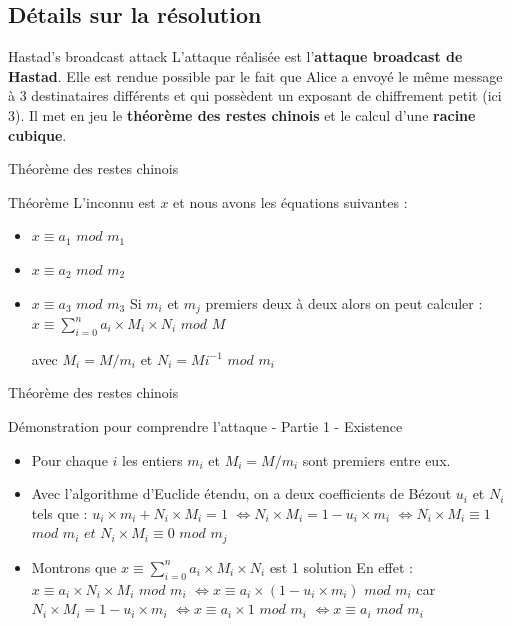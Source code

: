 \documentclass{beamer}
\begin{document}
	\subsection{Détails sur la résolution}

	\begin{frame}{Hastad's broadcast attack}
		L'attaque réalisée est l'\textbf{attaque broadcast de Hastad}. Elle est rendue possible par le fait que Alice a envoyé le même message à 3 destinataires différents et qui possèdent un exposant de chiffrement petit (ici $3$). Il met en jeu le \textbf{théorème des restes chinois} et le calcul d'une \textbf{racine cubique}.
	\end{frame}

	\begin{frame}{Théorème des restes chinois}
		\begin{block}{Théorème}
				L'inconnu est $x$ et nous avons les équations suivantes :
				\begin{itemize}
				\item $x \equiv a_1$ $mod$ $m_1$
				\item $x \equiv a_2$ $mod$ $m_2$
				\item $x \equiv a_3$ $mod$ $m_3$
				Si $m_i$ et $m_j$ premiers deux à deux alors on peut calculer : \newline
				\color{red}$x \equiv \sum \limits_{i=0}^{n}a_i \times M_i \times N_i$ $mod$ $M$ \color{black}

				avec $M_i=M / m_{i}$ et $N_i = Mi^{-1}$ $mod$ $m_i$
			\end{itemize}
		\end{block}
	\end{frame}

	\begin{frame}{Théorème des restes chinois}
	\begin{alertblock}{Démonstration pour comprendre l'attaque - Partie 1 - Existence}
		\begin{itemize}
		\item Pour chaque $i$ les entiers $m_i$ et $M_i=M/m_i$ sont premiers entre eux.
		\item Avec l'algorithme d'Euclide étendu, on a deux coefficients de Bézout $u_i$ et $N_i$ tels que :
		$u_i\times m_i + N_i\times M_i = 1$ \newline $\Leftrightarrow N_i \times M_i = 1 - u_i \times m_i$ \newline $\Leftrightarrow N_i \times M_i \equiv 1$ $mod$ $m_i$ $et$ $N_i \times M_i \equiv 0$ $mod$ $m_j$
		\item Montrons que $x \equiv \sum \limits_{i=0}^{n}a_i \times M_i \times N_i$ est 1 solution 
		\newline En effet : $x \equiv a_i \times N_i \times M_i$ $mod$ $m_i$ \newline $\Leftrightarrow x \equiv a_i \times (1 - u_i \times m_i)$ $mod$ $m_i$ car $N_i \times M_i = 1 - u_i \times m_i$\newline
		$\Leftrightarrow x \equiv a_i \times 1$ $mod$ $m_i$ 
		$\Leftrightarrow x \equiv a_i$ $mod$ $m_i$
		\end{itemize}
	\end{alertblock}
	\end{frame}
\end{document}

